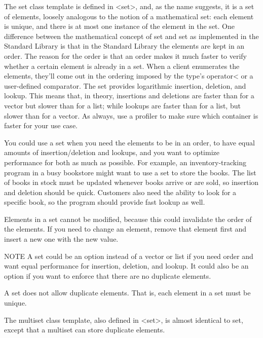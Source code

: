 The set class template is defined in <set>, and, as the name suggests, it is a set of elements, loosely analogous to the notion of a mathematical set: each element is unique, and there is at most one instance of the element in the set. One difference between the mathematical concept of set and set as implemented in the Standard Library is that in the Standard Library the elements are kept in an order. The reason for the order is that an order makes it much faster to verify whether a certain element is already in a set. When a client enumerates the elements, they’ll come out in the ordering imposed by the type’s operator< or a user-defined comparator. The set provides logarithmic insertion, deletion, and lookup. This means that, in theory, insertions and deletions are faster than for a vector but slower than for a list; while lookups are faster than for a list, but slower than for a vector. As always, use a profiler to make sure which container is faster for your use case.

You could use a set when you need the elements to be in an order, to have equal amounts of insertion/deletion and lookups, and you want to optimize performance for both as much as possible. For example, an inventory-tracking program in a busy bookstore might want to use a set to store the books. The list of books in stock must be updated whenever books arrive or are sold, so insertion and deletion should be quick. Customers also need the ability to look for a specific book, so the program should provide fast lookup as well.

Elements in a set cannot be modified, because this could invalidate the order of the elements. If you need to change an element, remove that element first and insert a new one with the new value.

\begin{myNotic}{NOTE}
A set could be an option instead of a vector or list if you need order and want equal performance for insertion, deletion, and lookup. It could also be an option if you want to enforce that there are no duplicate elements.
\end{myNotic}

A set does not allow duplicate elements. That is, each element in a set must be unique.


The multiset class template, also defined in <set>, is almost identical to set, except that a multiset can store duplicate elements.


